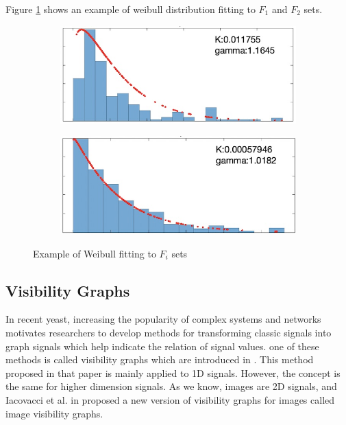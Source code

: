 \documentclass[conference]{IEEEtran}
\begin{document}
Figure \ref{fig:weibull_fit} shows an example of weibull distribution fitting to $F_1$ and $F_2$ sets.
\begin{figure}[tbh]
  \centering
  \begin{subfigure}{0.24\textwidth}
    \centering
    \includegraphics[width=\linewidth]{images/weibull1.jpg}
    \caption{}
  \end{subfigure}
  \hfill
  \begin{subfigure}{0.24\textwidth}
    \centering
    \includegraphics[width=\linewidth]{images/weibull2.jpg}
    \caption{}
  \end{subfigure}
  \caption{Example of Weibull fitting to $F_i$ sets}
  \label{fig:weibull_fit}
\end{figure}



\subsection{\textbf{Visibility Graphs}}
In recent yeast, increasing the popularity of complex systems and networks motivates researchers to develop methods for transforming classic signals into graph signals which help indicate the relation of signal values. one of these methods is called visibility graphs which are introduced in \cite{VG}. This method proposed in that paper is mainly applied to 1D signals. However, the concept is the same for higher dimension signals. As we know, images are 2D signals, and Iacovacci et al. in \cite{IVG} proposed a new version of visibility graphs for images called image visibility graphs.
\end{document}

